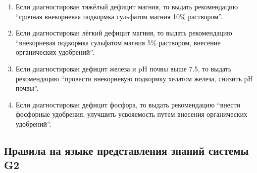 \begin{enumerate}
    \item Если диагностирован тяжёлый дефицит магния, то выдать рекомендацию \enquote{срочная внекорневая подкормка сульфатом магния 10\% раствором}.

    \item Если диагностирован лёгкий дефицит магния, то выдать рекомендацию \enquote{внекорневая подкормка сульфатом магния 5\% раствором, внесение органических удобрений}.

    \item Если диагностирован дефицит железа и pH почвы выше 7.5, то выдать рекомендацию \enquote{провести внекорневую подкормку хелатом железа, снизить pH почвы}.

    \item Если диагностирован дефицит фосфора, то выдать рекомендацию \enquote{внести фосфорные удобрения, улучшить усвояемость путем внесения органических удобрений}.
\end{enumerate}


\subsection{Правила на языке представления знаний системы G2}

